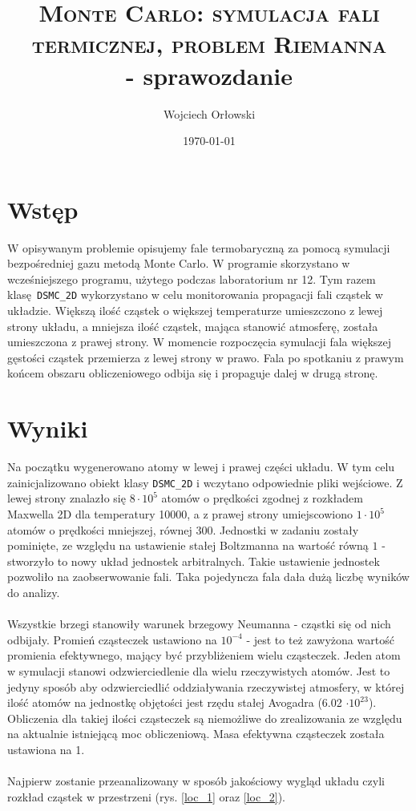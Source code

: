 \documentclass[a4paper, 12pt]{article}
\author{Wojciech Orłowski}
\date{\today}
\title{\textsc{Monte Carlo: symulacja fali termicznej, problem Riemanna}\\ - sprawozdanie}
\begin{document}
	\maketitle
	
	\section*{Wstęp}
	
	W opisywanym problemie opisujemy fale termobaryczną za pomocą symulacji bezpośredniej gazu metodą Monte Carlo.
	W programie skorzystano w wcześniejszego programu, użytego podczas laboratorium nr 12. 
	Tym razem klasę \texttt{DSMC\_2D} wykorzystano w celu monitorowania propagacji fali cząstek w układzie.
	Większą ilość cząstek o większej temperaturze umieszczono z lewej strony układu, a mniejsza ilość cząstek, mająca stanowić atmosferę, została umieszczona z prawej strony.
	W momencie rozpoczęcia symulacji fala większej gęstości cząstek przemierza z lewej strony w prawo.
	Fala po spotkaniu z prawym końcem obszaru obliczeniowego odbija się i propaguje dalej w drugą stronę.
	
	\section*{Wyniki}
	
	Na początku wygenerowano atomy w lewej i prawej części układu.
	W tym celu zainicjalizowano obiekt klasy \texttt{DSMC\_2D} i wczytano odpowiednie pliki wejściowe.
	Z lewej strony znalazło się $8 \cdot 10^5$ atomów o prędkości zgodnej z rozkładem Maxwella 2D dla temperatury 10000, a z prawej strony umiejscowiono $1 \cdot 10^5$ atomów o prędkości mniejszej, równej 300.
	Jednostki w zadaniu zostały pominięte, ze względu na ustawienie stałej Boltzmanna na wartość równą $1$ - stworzyło to nowy układ jednostek arbitralnych. 
	Takie ustawienie jednostek pozwoliło na zaobserwowanie fali.
	Taka pojedyncza fala dała dużą liczbę wyników do analizy. 
	\\
	\\
	Wszystkie brzegi stanowiły warunek brzegowy Neumanna - cząstki się od nich odbijały.
	Promień cząsteczek ustawiono na $10^{-4}$ - jest to też zawyżona wartość promienia efektywnego, mający być przybliżeniem wielu cząsteczek.
	Jeden atom w symulacji stanowi odzwierciedlenie dla wielu rzeczywistych atomów.
	Jest to jedyny sposób aby odzwierciedlić oddziaływania rzeczywistej atmosfery, w której ilość atomów na jednostkę objętości jest rzędu stałej Avogadra (6.02 $\cdot 10^{23}$).
	Obliczenia dla takiej ilości cząsteczek są niemożliwe do zrealizowania ze względu na aktualnie istniejącą moc obliczeniową.
	Masa efektywna cząsteczek została ustawiona na 1.
	\\
	\\
	Najpierw zostanie przeanalizowany w sposób jakościowy wygląd układu czyli rozkład cząstek w przestrzeni (rys. \ref{loc_1} oraz \ref{loc_2}).
\end{document}
